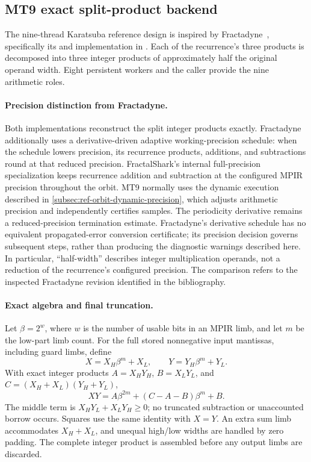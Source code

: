 \subsection{MT9 exact split-product backend}
\label{subsec:ref-orbit-mt9}

The nine-thread Karatsuba reference design is inspired by
Fractadyne~\cite{Fractadyne}, specifically its  and
 implementation in .
Each of the recurrence's three products is decomposed into three integer
products of approximately half the original operand width. Eight persistent
workers and the caller provide the nine arithmetic roles.

\paragraph{Precision distinction from Fractadyne.}
Both implementations reconstruct the split integer products exactly.
Fractadyne additionally uses a derivative-driven adaptive working-precision
schedule: when the schedule lowers precision, its recurrence products,
additions, and subtractions round at that reduced precision. FractalShark's
internal full-precision specialization keeps recurrence addition and
subtraction at the configured MPIR precision throughout the orbit. MT9 normally
uses the dynamic execution described in \cref{subsec:ref-orbit-dynamic-precision},
which adjusts arithmetic precision and independently certifies samples.
The periodicity derivative remains a reduced-precision termination estimate.
Fractadyne's derivative schedule has no equivalent propagated-error conversion
certificate; its precision decision governs subsequent steps, rather than
producing the diagnostic warnings described here.
In particular,
``half-width'' describes integer multiplication operands, not a reduction of
the recurrence's configured precision. The comparison refers to the inspected
Fractadyne revision identified in the bibliography.

\paragraph{Exact algebra and final truncation.}
Let $\beta=2^w$, where $w$ is the number of usable bits in an MPIR limb, and
let $m$ be the low-part limb count. For the full stored nonnegative input
mantissas, including guard limbs, define
\[
 X=X_H\beta^m+X_L,\qquad Y=Y_H\beta^m+Y_L.
\]
With exact integer products
$A=X_HY_H$, $B=X_LY_L$, and $C=(X_H+X_L)(Y_H+Y_L)$,
\begin{equation}
 XY=A\beta^{2m}+(C-A-B)\beta^m+B.
 \label{eq:mt9-karatsuba}
\end{equation}
The middle term is $X_HY_L+X_LY_H\ge0$; no truncated subtraction or
unaccounted borrow occurs. Squares use the same identity with $X=Y$.
An extra sum limb accommodates $X_H+X_L$, and unequal high/low widths are
handled by zero padding. The complete integer product is assembled before
any output limbs are discarded.

